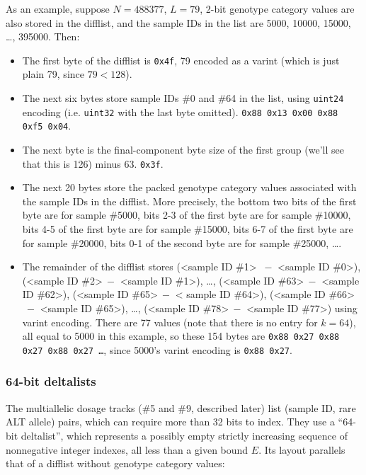\documentclass[8pt]{article}
\begin{document}
As an example, suppose $N=488377$, $L=79$, 2-bit genotype category values are
also stored in the difflist, and the sample IDs in the list are 5000, 10000,
15000, \ldots , 395000.  Then:

\begin{itemize}
\item The first byte of the difflist is \texttt{0x4f}, 79 encoded as a
  varint (which is just plain 79, since $79<128$).
\item The next six bytes store sample IDs \#0 and \#64 in the list, using
  \texttt{uint24} encoding (i.e. \texttt{uint32} with the last byte omitted).
  \texttt{0x88 0x13 0x00 0x88 0xf5 0x04}.
\item The next byte is the final-component byte size of the first group (we'll
  see that this is 126) minus 63.  \texttt{0x3f}.
\item The next 20 bytes store the packed genotype category values associated
  with the sample IDs in the difflist.  More precisely, the bottom two bits of
  the first byte are for sample \#5000, bits 2-3 of the first byte are for
  sample \#10000, bits 4-5 of the first byte are for sample \#15000, bits 6-7
  of the first byte are for sample \#20000, bits 0-1 of the second byte are for
  sample \#25000, \ldots .
\item The remainder of the difflist stores (\textless sample ID \#1\textgreater
  $\>-$ \textless sample ID \#0\textgreater ), (\textless sample ID
  \#2\textgreater $\>-$ \textless sample ID \#1\textgreater ), \ldots ,
  (\textless sample ID \#63\textgreater $\>-$ \textless sample ID
  \#62\textgreater ), (\textless sample ID \#65\textgreater $\>-$ \textless
  sample ID \#64\textgreater ), (\textless sample ID \#66\textgreater $\>-$
  \textless sample ID \#65\textgreater ), \ldots , (\textless sample ID
  \#78\textgreater $\>-$ \textless sample ID \#77\textgreater ) using varint
  encoding.  There are 77 values (note that there is no entry for $k=64$), all
  equal to 5000 in this example, so these 154 bytes are \texttt{0x88 0x27 0x88
  0x27 0x88 0x27 \ldots}, since 5000's varint encoding is \texttt{0x88 0x27}.
\end{itemize}

\subsubsection{64-bit deltalists}

The multiallelic dosage tracks (\#5 and \#9, described later) list (sample ID,
rare ALT allele) pairs, which can require more than 32 bits to index.  They use
a ``64-bit deltalist'', which represents a possibly empty strictly increasing
sequence of nonnegative integer indexes, all less than a given bound $E$.  Its
layout parallels that of a difflist without genotype category values:
\end{document}

